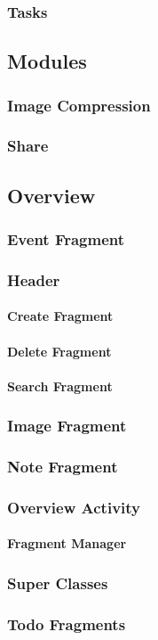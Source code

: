 	\subsubsection{Tasks}
\subsection{Modules}
	\subsubsection{Image Compression}
	\subsubsection{Share}
\subsection{Overview}
	\subsubsection{Event Fragment}
	\subsubsection{Header}
		\paragraph{Create Fragment}
		\paragraph{Delete Fragment}
		\paragraph{Search Fragment}
	\subsubsection{Image Fragment}
	\subsubsection{Note Fragment}
	\subsubsection{Overview Activity}
		\paragraph{Fragment Manager}
	\subsubsection{Super Classes}
	\subsubsection{Todo Fragments}